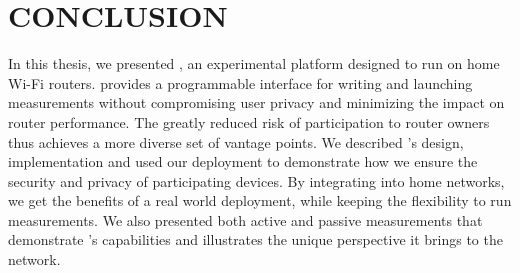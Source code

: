 \chapter{CONCLUSION}
\label{sec.conclusion}
In this thesis, we presented \sysname, an experimental platform designed to run on home Wi-Fi routers. \sysname provides a programmable interface for writing and launching measurements without compromising user privacy and minimizing the impact on router performance. The greatly reduced risk of participation to router owners thus achieves a more diverse set of vantage points. We described \sysname's design, implementation and used our deployment to demonstrate how we ensure the security and privacy of participating devices. By integrating \sysname into home networks, we get the benefits of a real world deployment, while keeping the flexibility to run measurements. We also presented both active and passive measurements that demonstrate \sysname's capabilities and illustrates the unique perspective it brings to the network. 